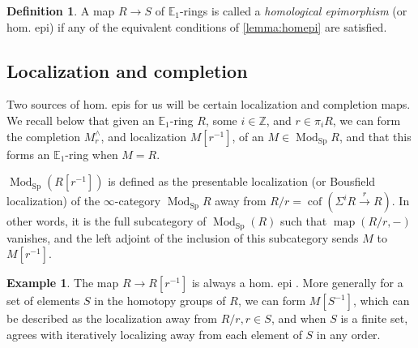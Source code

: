 \documentclass[12 pt]{amsart}
\theoremstyle{plain}
\theoremstyle{definition}
\newtheorem{definition}[theorem]{Definition}
\newtheorem{example}[theorem]{Example}
\theoremstyle{remark}
\numberwithin{equation}{section}
\DeclareMathOperator\Sp{Sp}
\DeclareMathOperator\cof{cof}
\DeclareMathOperator\Mod{Mod}
\DeclareMathOperator\map{map}
\newcommand\EE{\mathbb{E}}
\DeclareMathOperator\colim{colim}
\begin{document}
\begin{definition}\label{definition:homepi}
	A map $R \to S$ of $\EE_1$-rings is
	called a {\em homological epimorphism} (or hom. epi) 
	if any of the equivalent conditions of \autoref{lemma:homepi} are satisfied.
\end{definition}

\subsection{Localization and completion}
\label{subsection:localization}

Two sources of hom. epis for us will be certain localization and completion
maps. We recall below that given an $\EE_1$-ring $R$, some $i \in \mathbb Z$, and $r \in \pi_iR$,
we can form the completion $M^{\wedge}_r$, and localization $M[r^{-1}]$, of an
$M \in \Mod_{\Sp}R$, and that this forms an $\EE_1$-ring when $M=R$.

$\Mod_{\Sp}(R[r^{-1}])$ is defined as the presentable localization (or Bousfield localization) of the $\infty$-category $\Mod_{\Sp}R$ away from $R/r = \cof(\Sigma^iR\xrightarrow{r}R)$. In other words, it is the full subcategory of $\Mod_{\Sp}(R)$ such that $\map(R/r,-)$ vanishes, and the left adjoint of the inclusion of this subcategory sends $M$ to $M[r^{-1}]$. 

\begin{example}
	\label{example:localization-hom-epi}
	The map $R \to R[r^{-1}]$ is always a hom. epi \cite[Example 2.9.14]{sheavesonmanifolds}. More generally for a set of elements $S$ in the homotopy groups of $R$, we can form $M[S^{-1}]$, which can be described as the localization away from $R/r, r \in S$, and when $S$ is a finite set, agrees with iteratively localizing away from each element of $S$ in any order.
\end{example}
\end{document}
